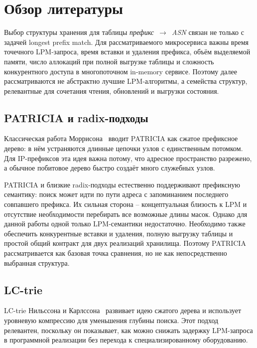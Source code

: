 \section{Обзор литературы}
\label{sec:storage-choice}

Выбор структуры хранения для таблицы
\textit{префикс~$\rightarrow$~ASN} связан не только с задачей longest
prefix match. Для рассматриваемого микросервиса важны время точечного
LPM-запроса, время вставки и удаления префикса, объём выделяемой памяти,
число аллокаций при полной выгрузке таблицы и сложность конкурентного
доступа в многопоточном in-memory сервисе. Поэтому далее
рассматриваются не абстрактно лучшие LPM-алгоритмы, а семейства
структур, релевантные для сочетания чтения, обновлений и выгрузки
состояния.

\subsection{PATRICIA и radix-подходы}

Классическая работа Моррисона~\cite{morrison1968patricia} вводит
PATRICIA как сжатое префиксное дерево: в нём устраняются длинные цепочки
узлов с единственным потомком. Для IP-префиксов эта идея важна потому,
что адресное пространство разрежено, а обычное побитовое дерево быстро
создаёт много служебных узлов.

PATRICIA и близкие radix-подходы естественно поддерживают префиксную
семантику: поиск может идти по пути адреса с запоминанием последнего
совпавшего префикса. Их сильная сторона -- концептуальная близость к LPM
и отсутствие необходимости перебирать все возможные длины масок. Однако
для данной работы одной только LPM-семантики недостаточно. Необходимо
также обеспечить конкурентные вставки и удаления, полную выгрузку таблицы
и простой общий контракт для двух реализаций хранилища. Поэтому
PATRICIA рассматривается как базовая точка сравнения, но не как
непосредственно выбранная структура.

\subsection{LC-trie}

LC-trie Нильссона и Карлссона~\cite{nilsson1999lctries} развивает идею
сжатого дерева и использует уровневую компрессию для уменьшения глубины
поиска. Этот подход релевантен, поскольку он показывает, как можно
снижать задержку LPM-запроса в программной реализации без перехода к
специализированному оборудованию.

